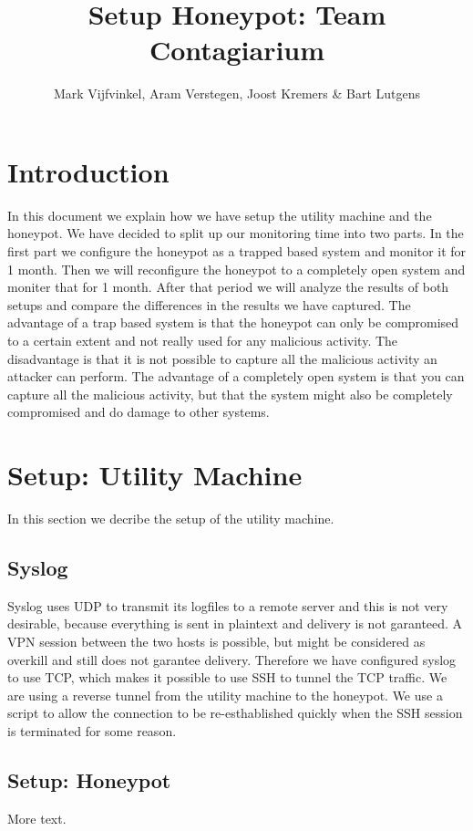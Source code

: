 \documentclass[11pt]{article} %
\title{Setup Honeypot: Team Contagiarium}
\author{Mark Vijfvinkel, Aram Verstegen, Joost Kremers \& Bart Lutgens}
\begin{document}
\maketitle

\section{Introduction}

In this document we explain how we have setup the utility machine and the honeypot. 
We have decided to split up our monitoring time into two parts. In the first part we configure the honeypot as a trapped based system and monitor it for 1 month.
Then we will reconfigure the honeypot to a completely open system and moniter that for 1 month. 
After that period we will analyze the results of both setups and compare the differences in the results we have captured. 
The advantage of a trap based system is that the honeypot can only be compromised to a certain extent and not really used for any malicious activity.
The disadvantage is that it is not possible to capture all the malicious activity an attacker can perform.
The advantage of a completely open system is that you can capture all the malicious activity, but that the system might also be completely compromised and do damage to other systems.


\section{Setup: Utility Machine}

In this section we decribe the setup of the utility machine.

\subsection{Syslog}
Syslog uses UDP to transmit its logfiles to a remote server and this is not very desirable, because everything is sent in plaintext and delivery is not garanteed.
A VPN session between the two hosts is possible, but might be considered as overkill and still does not garantee delivery.
Therefore we have configured syslog to use TCP, which makes it possible to use SSH to tunnel the TCP traffic.
We are using a reverse tunnel from the utility machine to the honeypot.
We use a script to allow the connection to be re-esthablished quickly when the SSH session is terminated for some reason. 
\cite{Remote_logging}



\subsection{Setup: Honeypot}

More text.





\end{document}
